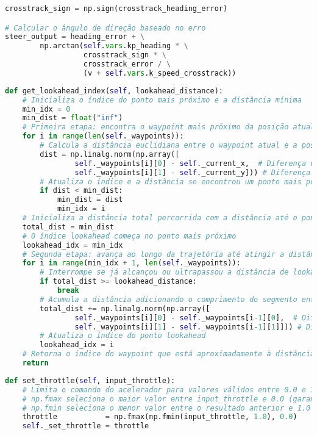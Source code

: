 \documentclass[
	12pt,				%
	oneside, %
	a4paper,			%
	english,			%
	french,				%
	spanish,			%
	brazil				%
	]{abntex2}
\begin{document}
\begin{apendicesenv}
\begin{lstlisting}[language=Python, caption=Implementação do controle lateral por perseguição pura., label=lst:lateral-control]
crosstrack_sign = np.sign(crosstrack_heading_error)

# Calcular o ângulo de direção baseado no erro
steer_output = heading_error + \
        np.arctan(self.vars.kp_heading * \
                  crosstrack_sign * \
                  crosstrack_error / \
                  (v + self.vars.k_speed_crosstrack))
\end{lstlisting}

\begin{lstlisting}[language=Python, caption=Método para determinação do ponto de referência., label=lst:lookahead-method]
def get_lookahead_index(self, lookahead_distance):
    # Inicializa o índice do ponto mais próximo e a distância mínima
    min_idx = 0
    min_dist = float("inf")
    # Primeira etapa: encontra o waypoint mais próximo da posição atual do veículo
    for i in range(len(self._waypoints)):
        # Calcula a distância euclidiana entre o waypoint atual e a posição do veículo
        dist = np.linalg.norm(np.array([
                self._waypoints[i][0] - self._current_x,  # Diferença na coordenada x
                self._waypoints[i][1] - self._current_y])) # Diferença na coordenada y
        # Atualiza o índice e a distância se encontrou um ponto mais próximo
        if dist < min_dist:
            min_dist = dist
            min_idx = i
    # Inicializa a distância total percorrida com a distância até o ponto mais próximo
    total_dist = min_dist
    # O índice lookahead começa no ponto mais próximo
    lookahead_idx = min_idx
    # Segunda etapa: avança ao longo da trajetória até atingir a distância de lookahead desejada
    for i in range(min_idx + 1, len(self._waypoints)):
        # Interrompe se já alcançou ou ultrapassou a distância de lookahead
        if total_dist >= lookahead_distance:
            break 
        # Acumula a distância adicionando o comprimento do segmento entre waypoints consecutivos
        total_dist += np.linalg.norm(np.array([
                self._waypoints[i][0] - self._waypoints[i-1][0],  # Diferença na coordenada x
                self._waypoints[i][1] - self._waypoints[i-1][1]])) # Diferença na coordenada y  
        # Atualiza o índice do ponto lookahead
        lookahead_idx = i
    # Retorna o índice do waypoint que está aproximadamente à distância de lookahead
    return
\end{lstlisting}

\begin{lstlisting}[language=Python, caption=Métodos para definição dos comandos de controle., label=lst:command-setting]
def set_throttle(self, input_throttle):
    # Limita o comando do acelerador para valores válidos entre 0.0 e 1.0
    # np.fmax seleciona o maior valor entre input_throttle e 0.0 (garante que não seja negativo)
    # np.fmin seleciona o menor valor entre o resultado anterior e 1.0 (garante que não exceda 1.0)
    throttle           = np.fmax(np.fmin(input_throttle, 1.0), 0.0)
    self._set_throttle = throttle


\end{lstlisting}
\end{apendicesenv}
\end{document}
